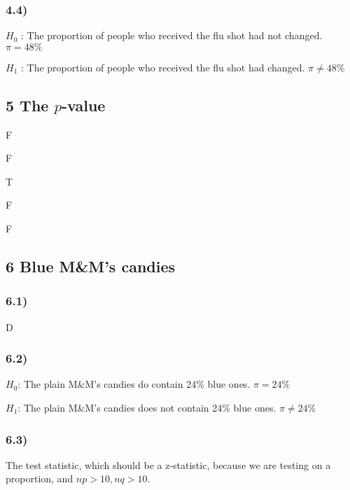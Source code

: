 \documentclass[
]{article}
\begin{document}
\hypertarget{section-4}{%
\subsubsection{4.4)}\label{section-4}}

\(H_0\) : The proportion of people who received the flu shot had not
changed. \(\pi = 48 \%\)

\(H_1\) : The proportion of people who received the flu shot had
changed. \(\pi \not = 48 \%\)

\hypertarget{the-p-value}{%
\subsection{\texorpdfstring{5 The
\(p\)-value}{5 The p-value}}\label{the-p-value}}

F

F

T

F

F

\hypertarget{blue-mms-candies}{%
\subsection{6 Blue M\&M's candies}\label{blue-mms-candies}}

\hypertarget{section-5}{%
\subsubsection{6.1)}\label{section-5}}

D

\hypertarget{section-6}{%
\subsubsection{6.2)}\label{section-6}}

\(H_0\): The plain M\&M's candies do contain 24\% blue ones.
\(\pi = 24 \%\)

\(H_1\): The plain M\&M's candies does not contain 24\% blue ones.
\(\pi \not= 24 \%\)

\hypertarget{section-7}{%
\subsubsection{6.3)}\label{section-7}}

The test statistic, which should be a z-statistic, because we are
testing on a proportion, and \(np > 10, nq > 10\).
\end{document}
